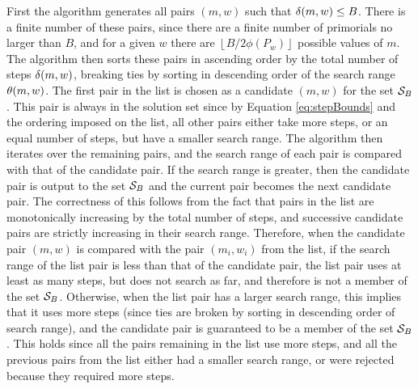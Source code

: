 \documentclass{ucalgthes1}
\theoremstyle{definition}
\newcommand{\floor}[1]{\left\lfloor #1 \right\rfloor}
\begin{document}
First the algorithm generates all pairs $(m, w)$ such that $\delta(m, w) \le B$.  There is a finite number of these pairs, since there are a finite number of primorials no larger than $B$, and for a given $w$ there are $\floor{B / 2\phi(P_w)}$ possible values of $m$.  The algorithm then sorts these pairs in ascending order by the total number of steps $\delta(m, w)$, breaking ties by sorting in descending order of the search range $\theta(m, w)$.  The first pair in the list is chosen as a candidate $(m, w)$ for the set $\mathcal S_B$.  This pair is always in the solution set since by Equation \ref{eq:stepBounds} and the ordering imposed on the list, all other pairs either take more steps, or an equal number of steps, but have a smaller search range.  The algorithm then iterates over the remaining pairs, and the search range of each pair is compared with that of the candidate pair.  If the search range is greater, then the candidate pair is output to the set $\mathcal S_B$ and the current pair becomes the next candidate pair.  The correctness of this follows from the fact that pairs in the list are monotonically increasing by the total number of steps, and successive candidate pairs are strictly increasing in their search range.  Therefore, when the candidate pair $(m, w)$ is compared with the pair $(m_i, w_i)$ from the list, if the search range of the list pair is less than that of the candidate pair, the list pair uses at least as many steps, but does not search as far, and therefore is not a member of the set $\mathcal S_B$.  Otherwise, when the list pair has a larger search range, this implies that it uses more steps (since ties are broken by sorting in descending order of search range), and the candidate pair is guaranteed to be a member of the set $\mathcal S_B$.  This holds since all the pairs remaining in the list use more steps, and all the previous pairs from the list either had a smaller search range, or were rejected because they required more steps.
\end{document}
